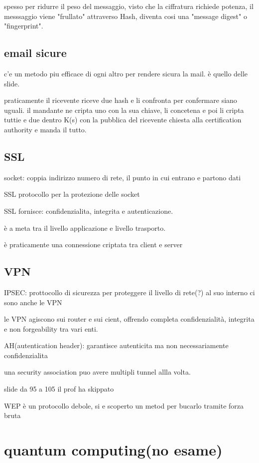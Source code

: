 \documentclass[12pt]{article}
\begin{document}
spesso per ridurre il peso del messaggio, visto che la ciffratura richiede potenza, il messsaggio viene "frullato" attraverso Hash, diventa cosi una "message digest" o "fingerprint".


\subsection{email sicure}

c'e un metodo piu efficace di ogni altro per rendere sicura la mail. è quello delle slide.

praticamente il ricevente riceve due hash e li confronta per confermare siano uguali. il mandante ne cripta uno con la sua chiave, li concetena e poi li cripta tuttie e due dentro K(s) con la pubblica del ricevente chiesta alla certification authority e manda il tutto.

\subsection{SSL}

socket: coppia indirizzo numero di rete, il punto in cui entrano e partono dati

SSL protocollo per la protezione delle socket

SSL fornisce: confidenzialita, integrita e autenticazione.

è a meta tra il livello applicazione e livello trasporto.

è  praticamente una connessione criptata tra client e server

\subsection{VPN}


IPSEC: prottocollo di sicurezza per proteggere il livello di rete(?) al suo interno ci sono anche le VPN

le VPN agiscono sui router e sui cient, offrendo completa confidenzialità, integrita e non forgeability tra vari enti.

AH(autentication header): garantisce autenticita ma non necessariamente confidenzialita

una security association puo avere multipli tunnel allla volta.

slide da 95 a 105 il prof ha skippato

WEP è un protocollo debole, si e scoperto un metod per bucarlo tramite forza bruta

\section{quantum computing(no esame)}
\end{document}
